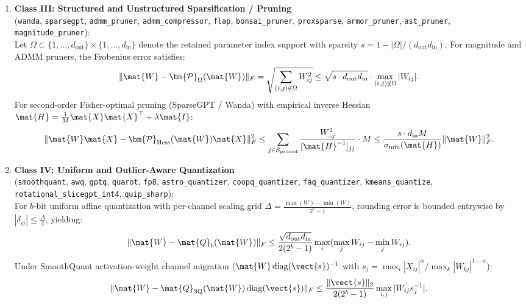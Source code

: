 \begin{theorem}
\begin{enumerate}
    \item \textbf{Class III: Structured and Unstructured Sparsification / Pruning} \\
    (\texttt{wanda}, \texttt{sparsegpt}, \texttt{admm\_pruner}, \texttt{admm\_compressor}, \texttt{flap}, \texttt{bonsai\_pruner}, \texttt{proxsparse}, \texttt{armor\_pruner}, \texttt{ast\_pruner}, \texttt{magnitude\_pruner}): \\
    Let $\Omega \subset \{1, \dots, d_{\text{out}}\} \times \{1, \dots, d_{\text{in}}\}$ denote the retained parameter index support with sparsity $s = 1 - |\Omega| / (d_{\text{out}} d_{\text{in}})$. For magnitude and ADMM pruners, the Frobenius error satisfies:
    \begin{equation}
    \|\mat{W} - \bm{\mathcal{P}}_\Omega(\mat{W})\|_F = \sqrt{\sum_{(i,j) \notin \Omega} W_{ij}^2} \le \sqrt{s \cdot d_{\text{out}} d_{\text{in}}} \cdot \max_{(i,j) \notin \Omega} |W_{ij}|.
    \label{eq:bound_class3_magnitude}
    \end{equation}
    For second-order Fisher-optimal pruning (SparseGPT / Wanda) with empirical inverse Hessian $\mat{H} = \frac{1}{M}\mat{X}\mat{X}^\top + \lambda \mat{I}$:
    \begin{equation}
    \|\mat{W}\mat{X} - \bm{\mathcal{P}}_{\text{Hess}}(\mat{W})\mat{X}\|_F^2 \le \sum_{j \in \mathcal{S}_{\text{pruned}}} \frac{W_{:, j}^2}{[\mat{H}^{-1}]_{jj}} \cdot M \le \frac{s \cdot d_{\text{in}} M}{\sigma_{\min}(\mat{H})} \|\mat{W}\|_F^2.
    \label{eq:bound_class3_sparsegpt}
    \end{equation}

    \item \textbf{Class IV: Uniform and Outlier-Aware Quantization} \\
    (\texttt{smoothquant}, \texttt{awq}, \texttt{gptq}, \texttt{quarot}, \texttt{fp8}, \texttt{astro\_quantizer}, \texttt{coopq\_quantizer}, \texttt{faq\_quantizer}, \texttt{kmeans\_quantize}, \texttt{rotational\_slicegpt\_int4}, \texttt{quip\_sharp}): \\
    For $b$-bit uniform affine quantization with per-channel scaling grid $\Delta = \frac{\max(W) - \min(W)}{2^b - 1}$, rounding error is bounded entrywise by $|\delta_{ij}| \le \frac{\Delta}{2}$, yielding:
    \begin{equation}
    \|\mat{W} - \mat{Q}_b(\mat{W})\|_F \le \frac{\sqrt{d_{\text{out}} d_{\text{in}}}}{2 (2^b - 1)} \max_i (\max_j W_{ij} - \min_j W_{ij}).
    \label{eq:bound_class4_uniform_quant}
    \end{equation}
    Under SmoothQuant activation-weight channel migration ($\mat{W} \operatorname{diag}(\vect{s})^{-1}$ with $s_j = \max_i |X_{ij}|^\alpha / \max_k |W_{kj}|^{1-\alpha}$):
    \begin{equation}
    \|\mat{W} - \mat{Q}_{\text{SQ}}(\mat{W}) \operatorname{diag}(\vect{s})\|_F \le \frac{\|\vect{s}\|_2}{2(2^b - 1)} \max_{i,j} |W_{ij} s_j^{-1}|.
    \label{eq:bound_class4_smoothquant}
    \end{equation}


\end{enumerate}
\end{theorem}
